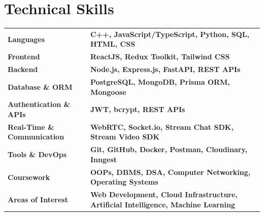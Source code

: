 \documentclass[10pt,a4paper]{article}
\begin{document}

\section{Technical Skills}

\small
\begin{tabularx}{\textwidth}{@{}>{\bfseries}l X@{}}

Languages &
\textbf{C++, JavaScript/TypeScript, Python, SQL, HTML, CSS}
\\[-0.5mm]

Frontend &
\textbf{ReactJS, Redux Toolkit, Tailwind CSS}
\\[-0.5mm]

Backend &
\textbf{Node.js, Express.js, FastAPI, REST APIs}
\\[-0.5mm]

Database \& ORM &
\textbf{PostgreSQL, MongoDB, Prisma ORM, Mongoose}
\\[-0.5mm]

Authentication \& APIs &
\textbf{JWT, bcrypt, REST APIs}
\\[-0.5mm]

Real-Time \& Communication &
\textbf{WebRTC, Socket.io, Stream Chat SDK, Stream Video SDK}
\\[-0.5mm]

Tools \& DevOps &
\textbf{Git, GitHub, Docker, Postman, Cloudinary, Inngest}
\\[-0.5mm]

Coursework &
\textbf{OOPs, DBMS, DSA, Computer Networking, Operating Systems}
\\[-0.5mm]

Areas of Interest &
\textbf{Web Development, Cloud Infrastructure, Artificial Intelligence, Machine Learning}

\end{tabularx}
\end{document}
